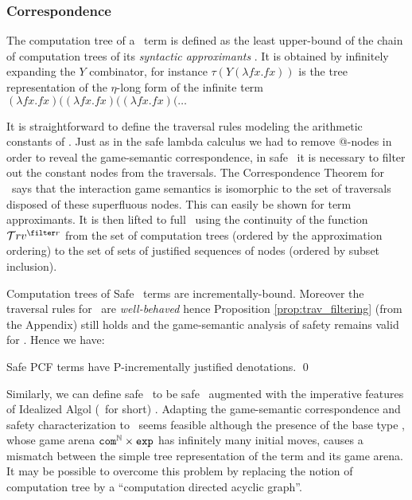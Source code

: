 \subsubsection{Correspondence}

The computation tree of a \pcf\ term is defined as the least
upper-bound of the chain of computation trees of its \emph{syntactic approximants} \cite{abramsky:game-semantics-tutorial}.  It is
obtained by infinitely expanding the $Y$ combinator,
for instance $\tau(Y (\lambda f x. f x))$ is the tree representation
of the $\eta$-long form of the infinite term $(\lambda f x. f x)
 ((\lambda f x. f x) ((\lambda f x. f x) ( \ldots$

It is straightforward to define the traversal rules modeling the
arithmetic constants of \pcf. Just as in the safe lambda calculus
we had to remove @-nodes in order to reveal the game-semantic
correspondence, in safe \pcf\ it is necessary to filter out the
constant nodes from the traversals. The Correspondence Theorem for
\pcf\ says that the interaction game semantics is isomorphic to the
set of traversals disposed of these superfluous nodes. This can easily be shown
for term approximants. It is then lifted to full \pcf\ using the continuity of the function
$\travset^{\filter r}$ from the set of computation trees (ordered by the approximation ordering) to the set of sets of justified sequences of nodes (ordered by subset inclusion).


Computation trees of Safe \pcf\ terms are incrementally-bound.
Moreover the traversal rules for \pcf\ are \emph{well-behaved} hence
Proposition \ref{prop:trav_filtering} (from the Appendix) still holds and
the game-semantic analysis of safety remains valid for \pcf. Hence
we have:
\begin{theorem}
\label{thm:safepcfpincr}
Safe PCF terms have P-incrementally justified denotations. \qed
\end{theorem}

Similarly, we can define safe \ialgol\ to be safe \pcf\ augmented with
the imperative features of Idealized Algol (\ialgol\ for short)
\cite{Reynolds81}.  Adapting the game-semantic correspondence and
safety characterization to \ialgol\ seems feasible although the
presence of the base type \iavar, whose game arena $\texttt{com}^{\mathbb{N}}
\times \texttt{exp}$ has infinitely many initial moves, causes a mismatch
between the simple tree representation of the term and its game
arena. It may be possible to overcome this problem by replacing the
notion of computation tree by a ``computation directed acyclic
graph''.

